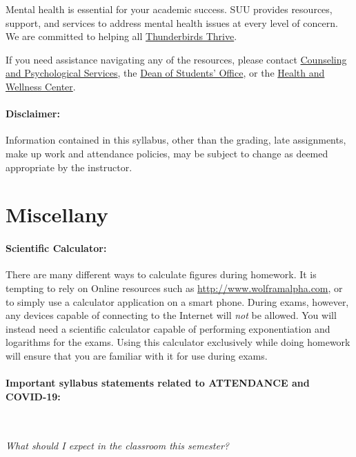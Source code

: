 \documentclass[12pt, letterpaper]{article}
\begin{document}
\noindent
Mental health is essential for your academic success. SUU provides resources, support, and services to address mental health issues at every level of concern. We are committed to helping all \href{https://www.suu.edu/mentalhealth/}{Thunderbirds Thrive}. 

\noindent
If you need assistance navigating any of the resources, please contact \href{https://www.suu.edu/caps/}{Counseling and Psychological Services}, the \href{https://www.suu.edu/deanofstudents/}{Dean of Students’ Office}, or the \href{https://www.suu.edu/health/}{Health and Wellness Center}.

\paragraph{Disclaimer:}
Information contained in this syllabus, other than the grading, late assignments, make up work and attendance policies, may be subject to change as deemed appropriate by the instructor.

\section*{Miscellany}

\paragraph{Scientific Calculator:}
There are many different ways to calculate figures during homework. It is tempting to rely on Online resources such as \href{http://www.wolframalpha.com}{http://www.wolframalpha.com}, or to simply use a calculator application on a smart phone. During exams, however, any devices capable of connecting to the Internet will \emph{not} be allowed. You will instead need a scientific calculator capable of performing exponentiation and logarithms for the exams. Using this calculator exclusively while doing homework will ensure that you are familiar with it for use during exams.

\paragraph{Important syllabus statements related to ATTENDANCE and COVID-19:} ~

\noindent\emph{What should I expect in the classroom this semester?}
\end{document}
